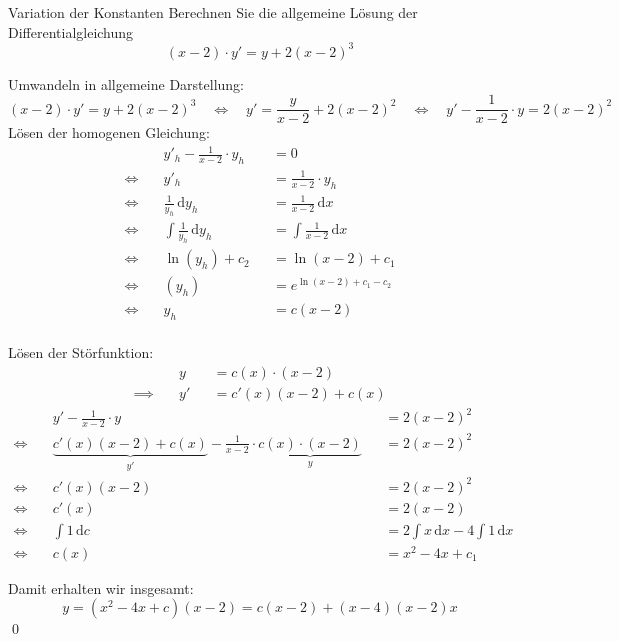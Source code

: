 \documentclass[german]{../spicker}
\renewcommand{\d}{\,\mathrm{d}}
\begin{document}
\begin{example}{Variation der Konstanten}
    Berechnen Sie die allgemeine Lösung der Differentialgleichung
    $$
        (x-2) \cdot y' = y + 2(x-2)^3
    $$
    \exampleseparator

    Umwandeln in allgemeine Darstellung:
    $$
        (x-2) \cdot y' = y + 2(x-2)^3 \quad \iff \quad y' = \frac{y}{x-2} + 2(x-2)^2 \quad \iff \quad y' - \frac{1}{x-2}\cdot y = 2(x-2)^2
    $$
    Lösen der homogenen Gleichung:
    $$
        \begin{aligned}
                       & y'_h - \frac{1}{x-2}\cdot y_h &  & = 0                         \\
            \iff \quad & y'_h                          &  & = \frac{1}{x-2}\cdot y_h    \\
            \iff \quad & \frac{1}{y_h} \d y_h          &  & = \frac{1}{x-2}\d x         \\
            \iff \quad & \int \frac{1}{y_h} \d y_h     &  & = \int \frac{1}{x-2}\d x    \\
            \iff \quad & \ln(y_h) + c_2                &  & = \ln (x-2) + c_1           \\
            \iff \quad & (y_h)                         &  & = e^{\ln (x-2) + c_1 - c_2} \\
            \iff \quad & y_h                           &  & = c(x-2)                    \\
        \end{aligned}
    $$

    Lösen der Störfunktion:
    $$
        \begin{aligned}
                           & y  &  & = c(x) \cdot (x-2)  \\
            \implies \quad & y' &  & = c'(x)(x-2) + c(x)
        \end{aligned}
    $$
    $$
        \begin{aligned}
                       & y' - \frac{1}{x-2}\cdot y                                                                  &  & = 2(x-2)^2                   \\
            \iff \quad & \underbrace{c'(x)(x-2) + c(x)}_{y'} - \frac{1}{x-2}\cdot \underbrace{c(x) \cdot (x-2)}_{y} &  & = 2(x-2)^2                   \\
            \iff \quad & c'(x)(x-2)                                                                                 &  & = 2(x-2)^2                   \\
            \iff \quad & c'(x)                                                                                      &  & = 2(x-2)                     \\
            \iff \quad & \int 1 \d c                                                                                &  & = 2\int x\d x - 4\int 1 \d x \\
            \iff \quad & c(x)                                                                                       &  & = x^2 - 4x + c_1
        \end{aligned}
    $$

    Damit erhalten wir insgesamt:
    $$
        y = (x^2 - 4x + c)(x-2) = c(x-2) + (x-4)(x-2)x
    $$\qed
\end{example}
\end{document}
